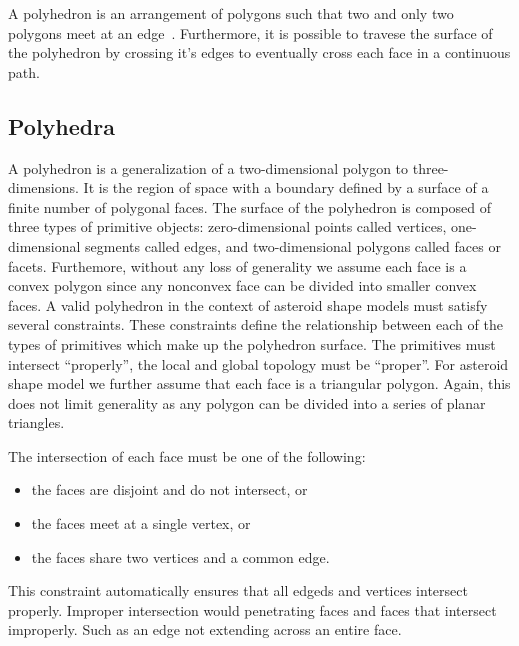 A \gls{polyhedron} is an arrangement of \glspl{polygon} such that two and only two \glspl{polygon} meet at an edge~\cite{mortenson1997}.
Furthermore, it is possible to travese the surface of the \gls{polyhedron} by crossing it's edges to eventually cross each face in a continuous path.

\subsection{Polyhedra}

A polyhedron is a generalization of a two-dimensional polygon to three-dimensions.
It is the region of space with a boundary defined by a surface of a finite number of polygonal faces.
The surface of the polyhedron is composed of three types of primitive objects: zero-dimensional points called vertices, one-dimensional segments called edges, and two-dimensional polygons called faces or facets.
Furthemore, without any loss of generality we assume each face is a convex polygon since any nonconvex face can be divided into smaller convex faces.
A valid polyhedron in the context of asteroid shape models must satisfy several constraints.
These constraints define the relationship between each of the types of primitives which make up the polyhedron surface.
The primitives must intersect ``properly'', the local and global topology must be ``proper''.
For asteroid shape model we further assume that each face is a triangular polygon. 
Again, this does not limit generality as any polygon can be divided into a series of planar triangles.

The intersection of each face must be one of the following:
\begin{itemize}
    \item the faces are disjoint and do not intersect, or
    \item the faces meet at a single vertex, or
    \item the faces share two vertices and a common edge.
\end{itemize}
This constraint automatically ensures that all edgeds and vertices intersect properly.
Improper intersection would penetrating faces and faces that intersect improperly. 
Such as an edge not extending across an entire face.

